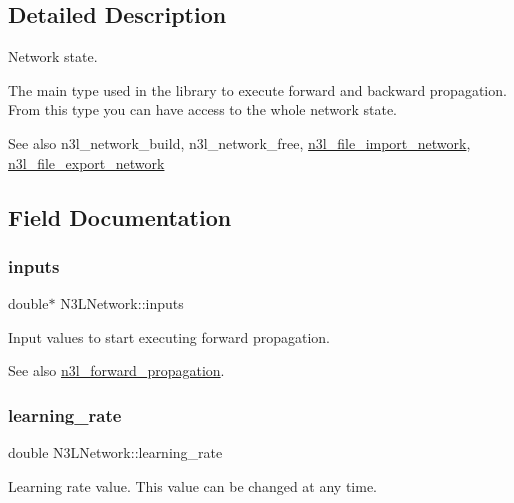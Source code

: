 \subsection{Detailed Description}
Network state. 

The main type used in the library to execute forward and backward propagation. From this type you can have access to the whole network state.

\begin{DoxySeeAlso}{See also}
n3l\+\_\+network\+\_\+build, n3l\+\_\+network\+\_\+free, \hyperlink{n3__file_8c_a4fef76548ed87845dceafaa9527a83d0}{n3l\+\_\+file\+\_\+import\+\_\+network}, \hyperlink{n3__file_8c_aea5e504fe0f565507b01729737f16341}{n3l\+\_\+file\+\_\+export\+\_\+network} 
\end{DoxySeeAlso}


\subsection{Field Documentation}
\mbox{\label{structN3LNetwork_a45ff5bcae18502559925aba0cbd0313b}} 
\subsubsection{\texorpdfstring{inputs}{inputs}}
{\footnotesize\ttfamily double$\ast$ N3\+L\+Network\+::inputs}

Input values to start executing forward propagation. \begin{DoxySeeAlso}{See also}
\hyperlink{n3__forward_8c_abc37ac7f137db4d053e3b19ac8e6542a}{n3l\+\_\+forward\+\_\+propagation}. 
\end{DoxySeeAlso}
\mbox{\label{structN3LNetwork_ae7c5e2ed74786685185cf2cbb955bf51}} 
\subsubsection{\texorpdfstring{learning\+\_\+rate}{learning\_rate}}
{\footnotesize\ttfamily double N3\+L\+Network\+::learning\+\_\+rate}

Learning rate value. This value can be changed at any time. \mbox{\label{structN3LNetwork_ae77d4b7deecdc3c9590a4112689db2f8}} 
